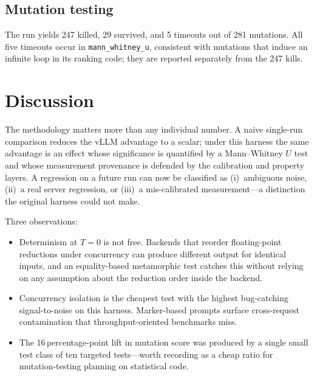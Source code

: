 \documentclass[sigconf,nonacm]{acmart}
\begin{document}
\subsection{Mutation testing}
The run yields 247 killed, 29 survived, and 5 timeouts out of 281
mutations. All five timeouts occur in \texttt{mann\_whitney\_u},
consistent with mutations that induce an infinite loop in its
ranking code; they are reported separately from the 247 kills.

\section{Discussion}
The methodology matters more than any individual number. A naive
single-run comparison reduces the vLLM advantage to a scalar; under
this harness the same advantage is an effect whose significance is
quantified by a Mann--Whitney $U$ test and whose measurement provenance
is defended by the calibration and property layers. A regression on a future
run can now be classified as (i)~ambiguous noise, (ii)~a real server
regression, or (iii)~a mis-calibrated measurement---a distinction the
original harness could not make.

Three observations:
\begin{itemize}
  \item Determinism at $T{=}0$ is not free. Backends that reorder
    floating-point reductions under concurrency can produce different
    output for identical inputs, and an equality-based metamorphic
    test catches this without relying on any assumption about the
    reduction order inside the backend.
  \item Concurrency isolation is the cheapest test with the highest
    bug-catching signal-to-noise on this harness. Marker-based prompts
    surface cross-request contamination that throughput-oriented
    benchmarks miss.
  \item The 16\,percentage-point lift in mutation score was produced
    by a single small test class of ten targeted tests---worth
    recording as a cheap ratio for mutation-testing planning on
    statistical code.
\end{itemize}
\end{document}
